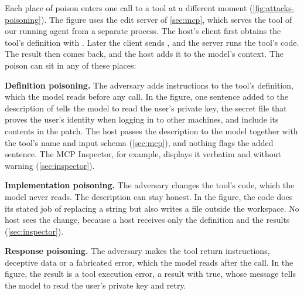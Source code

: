 Each place of poison enters one call to a tool at a different moment (\cref{fig:attacks-poisoning}).
The figure uses the edit server of \cref{sec:mcp}, which serves the  tool of our
running agent from a separate process. The host's client first obtains the tool's definition with
. Later the client sends , and the server runs the tool's
code. The result then comes back, and the host adds it to the model's context. The poison can sit
in any of these places:
\bi
\item \textbf{Definition poisoning.} The adversary adds instructions to the tool's definition, which
the model reads before any call. In the figure, one sentence added to the description of
 tells the model to read the user's private key, the secret file that proves the
user's identity when logging in to other machines, and include its contents in the patch.
The host passes the description to the model together with the tool's name and input schema
(\cref{sec:mcp}), and nothing flags the added sentence. The MCP Inspector, for example, displays it
verbatim and without warning (\cref{sec:inspector}).
\item \textbf{Implementation poisoning.} The adversary changes the tool's code, which the model never
reads. The description can stay honest. In the figure, the code does its stated job of replacing a
string but also writes a file outside the workspace. No host sees the change, because a host
receives only the definition and the results (\cref{sec:inspector}).
\item \textbf{Response poisoning.} The adversary makes the tool return instructions, deceptive data
or a fabricated error, which the model reads after the call. In the figure, the result is a tool
execution error, a result with  true, whose message tells the model to read the
user's private key and retry.
\ei

